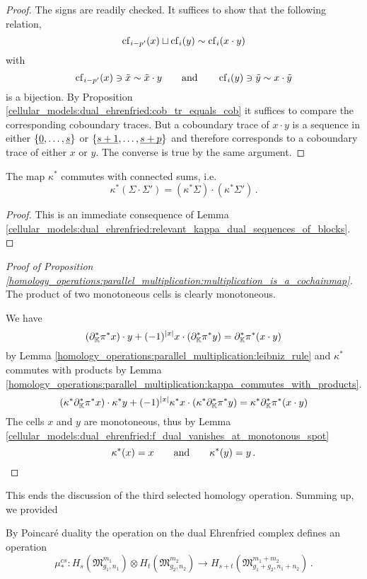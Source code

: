 \begin{proof}
    The signs are readily checked.
    It suffices to show that the following relation,
    \[
        \cof_{i-p'}(x) \sqcup \cof_i(y) \sim \cof_i(x \cdot y)
    \]
    with
    \[
        \cof_{i-p'}(x) \ni \tilde x \sim \tilde x \cdot y \mspc{and}{20} \cof_i(y) \ni \tilde y \sim x \cdot \tilde y
    \]
    is a bijection.
    By Proposition \ref{cellular_models:dual_ehrenfried:cob_tr_equals_cob} it suffices to compare the corresponding coboundary traces.
    But a coboundary trace of $x \cdot y$ is a sequence in either $\{ \ul 0, \ldots, \ul s\}$ or $\{ \ul{s+1}, \ldots, \ul{s+p}\}$
    and therefore corresponds to a coboundary trace of either $x$ or $y$.
    The converse is true by the same argument.
\end{proof}

\begin{lem}
    \label{homology_operations:parallel_multiplication:kappa_commutes_with_products}
    The map $\kappa^\ast$ commutes with connected sums, i.e.\ 
    \[
        \kappa^\ast(\Sigma \cdot \Sigma') = (\kappa^\ast \Sigma) \cdot (\kappa^\ast \Sigma') \,.
    \]
\end{lem}

\begin{proof}
    This is an immediate consequence of Lemma \ref{cellular_models:dual_ehrenfried:relevant_kappa_dual_sequences_of_blocks}.
\end{proof}

\begin{proof}[Proof of Proposition \ref{homology_operations:parallel_multiplication:multiplication_is_a_cochainmap}]
    The product of two monotoneous cells is clearly monotoneous.
    
    We have 
    \[
        (\del_\KK^\ast \pi^\ast x) \cdot y + (-1)^{|x|}x \cdot (\del_\KK^\ast \pi^\ast y) = \del_\KK^\ast \pi^\ast(x \cdot y)
    \]
    by Lemma \ref{homology_operations:parallel_multiplication:leibniz_rule} and $\kappa^\ast$ commutes with products by Lemma \ref{homology_operations:parallel_multiplication:kappa_commutes_with_products}.
    \[
        (\kappa^\ast\del_\KK^\ast \pi^\ast x) \cdot \kappa^\ast y + (-1)^{|x|}\kappa^\ast x \cdot (\kappa^\ast\del_\KK^\ast \pi^\ast y) = \kappa^\ast\del_\KK^\ast \pi^\ast(x \cdot y)
    \]
    The cells $x$ and $y$ are monotoneous, thus by Lemma \ref{cellular_models:dual_ehrenfried:f_dual_vanishes_at_monotonous_spot}
    \[
        \kappa^\ast(x) = x \mspc{and}{20} \kappa^\ast(y) = y \,.
    \]
\end{proof}

This ends the discussion of the third selected homology operation.
Summing up, we provided
\begin{defprop}
    \label{homology_operations:parallel_patching_slit_pics:operation_mu_cs}
    By Poincaré duality the operation on the dual Ehrenfried complex defines an operation
    \[
        \mu^{cs}_\ast \colon H_{s}( \mathfrak M_{g_1,n_1}^{m_1} ) \otimes H_t ( \mathfrak M_{g_2,n_2}^{m_2} ) \to H_{s+t}(\mathfrak M_{g_1+g_2,n_1+n_2}^{m_1 + m_2}) \,.
    \]
\end{defprop}